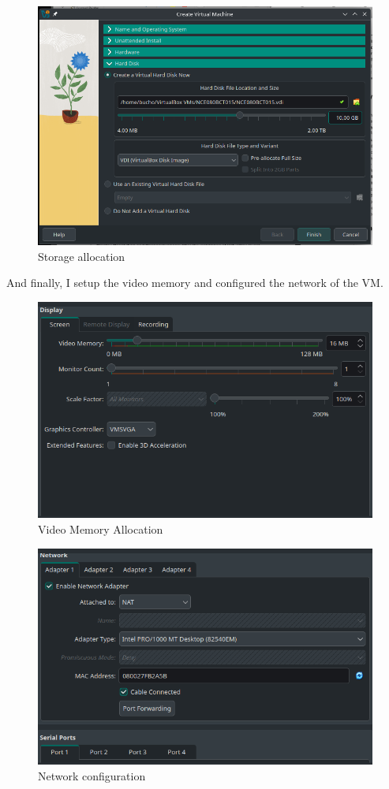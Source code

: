 \documentclass[a4paper,12pt]{report}
\begin{document}
\begin{figure}[h]
    \centering
    \includegraphics[width=0.7\linewidth]{storage_allocation.png}
    \caption{Storage allocation}
    \label{fig5}
\end{figure}
\newpage
And finally, I setup the video memory and configured the network of the VM. 
\begin{figure}[h]
    \centering
    \includegraphics[width=0.7\linewidth]{video_mem.png}
    \caption{Video Memory Allocation}
    \label{fig6}
\end{figure}
\begin{figure}[h]
    \centering
    \includegraphics[width=0.7\linewidth]{network_config.png}
    \caption{Network configuration}
    \label{fig7}
\end{figure}
\end{document}
